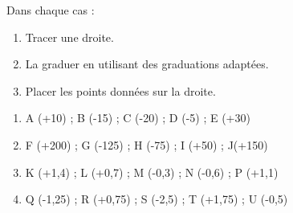 \documentclass[exercice]{thedocument}%
\begin{document}
%
Dans chaque cas :
\begin{enumerate}
    \item Tracer une droite.
    \item La graduer en utilisant des graduations adaptées.
    \item Placer les points données sur la droite.
\end{enumerate}\vskip15pt
\begin{enumerate}
    \item A (+10) ; B (-15) ; C (-20) ; D (-5) ; E (+30)
    \item F (+200) ; G (-125) ; H (-75) ; I (+50) ; J(+150)
    \item K (+1,4) ; L (+0,7) ; M (-0,3) ; N (-0,6) ; P (+1,1)
    \item Q (-1,25) ; R (+0,75) ; S (-2,5) ; T (+1,75) ; U (-0,5)
\end{enumerate}
\end{document}
